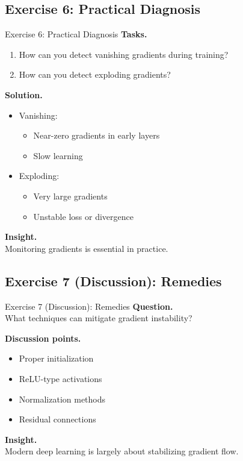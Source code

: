 \documentclass[aspectratio=169,11pt]{beamer}
\begin{document}
\subsection{Exercise 6: Practical Diagnosis}
\begin{frame}[t,allowframebreaks]{Exercise 6: Practical Diagnosis}
\small
\textbf{Tasks.}\\ \begin{enumerate}
    \item How can you detect vanishing gradients during training?
    \item How can you detect exploding gradients?
\end{enumerate}

\textbf{Solution.}\\ \begin{itemize}
    \item Vanishing:
    \begin{itemize}
        \item Near-zero gradients in early layers
        \item Slow learning
    \end{itemize}

    \item Exploding:
    \begin{itemize}
        \item Very large gradients
        \item Unstable loss or divergence
    \end{itemize}
\end{itemize}

\textbf{Insight.}\\ Monitoring gradients is essential in practice.
\end{frame}

\subsection{Exercise 7 (Discussion): Remedies}
\begin{frame}[t,allowframebreaks]{Exercise 7 (Discussion): Remedies}
\small
\textbf{Question.}\\ What techniques can mitigate gradient instability?

\textbf{Discussion points.}\\ \begin{itemize}
    \item Proper initialization
    \item ReLU-type activations
    \item Normalization methods
    \item Residual connections
\end{itemize}

\textbf{Insight.}\\ Modern deep learning is largely about stabilizing gradient flow.
\end{frame}
\end{document}
